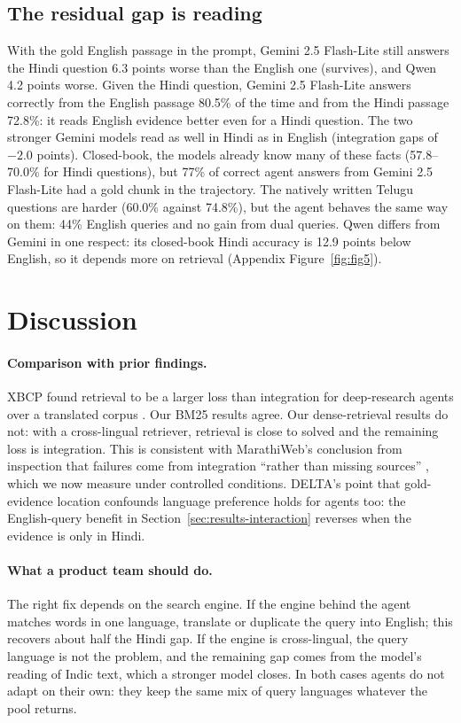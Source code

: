 \subsection{The residual gap is reading}
\label{sec:results-retriever}
With the gold English passage in the prompt, Gemini 2.5 Flash-Lite still answers the Hindi question 6.3 points worse than the English one (survives), and Qwen 4.2 points worse. Given the Hindi question, Gemini 2.5 Flash-Lite answers correctly from the English passage 80.5\% of the time and from the Hindi passage 72.8\%: it reads English evidence better even for a Hindi question. The two stronger Gemini models read as well in Hindi as in English (integration gaps of $-2.0$ points). Closed-book, the models already know many of these facts (57.8--70.0\% for Hindi questions), but 77\% of correct agent answers from Gemini 2.5 Flash-Lite had a gold chunk in the trajectory. The natively written Telugu questions are harder (60.0\% against 74.8\%), but the agent behaves the same way on them: 44\% English queries and no gain from dual queries. Qwen differs from Gemini in one respect: its closed-book Hindi accuracy is 12.9 points below English, so it depends more on retrieval (Appendix Figure~\ref{fig:fig5}).

\section{Discussion}
\label{sec:discussion}

\paragraph{Comparison with prior findings.} XBCP found retrieval to be a larger loss than integration for deep-research agents over a translated corpus \citep{a2606_15345}. Our BM25 results agree. Our dense-retrieval results do not: with a cross-lingual retriever, retrieval is close to solved and the remaining loss is integration. This is consistent with MarathiWeb's conclusion from inspection that failures come from integration ``rather than missing sources'' \citep{kale2026marathiweb}, which we now measure under controlled conditions. DELTA's point that gold-evidence location confounds language preference \citep{a2601_02956} holds for agents too: the English-query benefit in Section~\ref{sec:results-interaction} reverses when the evidence is only in Hindi.

\paragraph{What a product team should do.} The right fix depends on the search engine. If the engine behind the agent matches words in one language, translate or duplicate the query into English; this recovers about half the Hindi gap. If the engine is cross-lingual, the query language is not the problem, and the remaining gap comes from the model's reading of Indic text, which a stronger model closes. In both cases agents do not adapt on their own: they keep the same mix of query languages whatever the pool returns.


